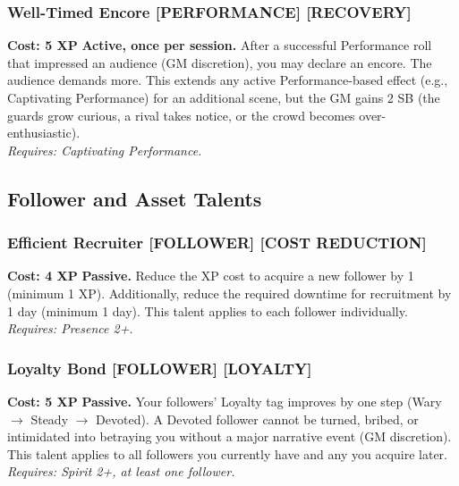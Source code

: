 \documentclass[12pt,a4paper]{book}
\begin{document}
\subsubsection*{Well-Timed Encore \textnormal{[PERFORMANCE] [RECOVERY]}}
\label{talent:well-timed-encore}
\textbf{Cost: 5 XP} \textbf{Active, once per session.} After a successful Performance roll that impressed an audience (GM discretion), you may declare an encore. The audience demands more. This extends any active Performance-based effect (e.g., Captivating Performance) for an additional scene, but the GM gains 2 SB (the guards grow curious, a rival takes notice, or the crowd becomes over-enthusiastic). \\
\textit{Requires: Captivating Performance.}

\subsection*{Follower and Asset Talents}
\label{sec:major-follower-asset}

\subsubsection*{Efficient Recruiter \textnormal{[FOLLOWER] [COST REDUCTION]}}
\label{talent:efficient-recruiter}
\textbf{Cost: 4 XP} \textbf{Passive.} Reduce the XP cost to acquire a new follower by 1 (minimum 1 XP). Additionally, reduce the required downtime for recruitment by 1 day (minimum 1 day). This talent applies to each follower individually. \\
\textit{Requires: Presence 2+.}

\subsubsection*{Loyalty Bond \textnormal{[FOLLOWER] [LOYALTY]}}
\label{talent:loyalty-bond}
\textbf{Cost: 5 XP} \textbf{Passive.} Your followers' Loyalty tag improves by one step (Wary $\rightarrow$ Steady $\rightarrow$ Devoted). A Devoted follower cannot be turned, bribed, or intimidated into betraying you without a major narrative event (GM discretion). This talent applies to all followers you currently have and any you acquire later. \\
\textit{Requires: Spirit 2+, at least one follower.}
\end{document}
